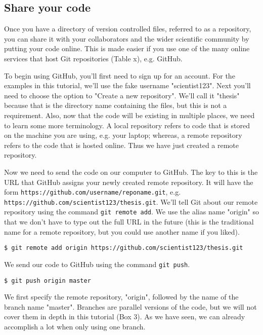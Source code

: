 \subsection{Share your code}

Once you have a directory of version controlled files, referred to as a repository, you can share it with your collaborators and the wider scientific community by putting your code online.
This is made easier if you use one of the many online services that host Git repositories (Table x), e.g. GitHub.

To begin using GitHub, you'll first need to sign up for an account.
For the examples in this tutorial, we'll use the fake username "scientist123".
Next you'll need to choose the option to "Create a new repository".
We'll call it "thesis" because that is the directory name containing the files, but this is not a requirement.
Also, now that the code will be existing in multiple places, we need to learn some more terminology.
A local repository refers to code that is stored on the machine you are using, e.g. your laptop; whereas, a remote repository refers to the code that is hosted online.
Thus we have just created a remote repository.

Now we need to send the code on our computer to GitHub.
The key to this is the URL that GitHub assigns your newly created remote repository.
It will have the form \verb|https://github.com/username/reponame.git|, e.g. \verb|https://github.com/scientist123/thesis.git|.
We'll tell Git about our remote repository using the command \verb|git remote add|.
We use the alias name "origin" so that we don't have to type out the full URL in the future (this is the traditional name for a remote repository, but you could use another name if you liked).

\begin{lstlisting}
$ git remote add origin https://github.com/scientist123/thesis.git
\end{lstlisting}

We send our code to GitHub using the command \verb|git push|.

\begin{lstlisting}
$ git push origin master
\end{lstlisting}

We first specify the remote repository, "origin", followed by the name of the branch name "master".
Branches are parallel versions of the code, but we will not cover them in depth in this tutorial (Box 3).
As we have seen, we can already accomplish a lot when only using one branch.

